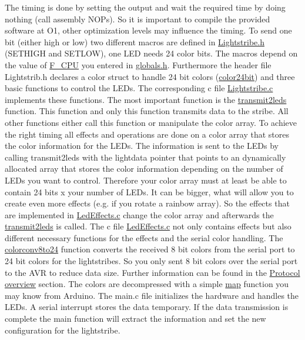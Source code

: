 The timing is done by setting the output and wait the required time by doing nothing (call assembly N\+O\+Ps). So it is important to compile the provided software at O1, other optimization levels may influence the timing. To send one bit (either high or low) two different macros are defined in \hyperlink{_lightstribe_8h}{Lightstribe.\+h} (S\+E\+T\+H\+I\+G\+H and S\+E\+T\+L\+O\+W), one L\+E\+D needs 24 color bits. The macros depend on the value of \hyperlink{globals_8h_a43bafb28b29491ec7f871319b5a3b2f8}{F\+\_\+\+C\+P\+U} you entered in \hyperlink{globals_8h}{globals.\+h}. Furthermore the header file Lightstrib.\+h declares a color struct to handle 24 bit colors (\hyperlink{structcolor24bit}{color24bit}) and three basic functions to control the L\+E\+Ds. The corresponding c file \hyperlink{_lightstribe_8c}{Lightstribe.\+c} implements these functions. The most important function is the \hyperlink{_lightstribe_8h_aac724dad670e4a26723daf71ce6a8d8a}{transmit2leds} function. This function and only this function transmits data to the stribe. All other functions either call this function or manipulate the color array. To achieve the right timing all effects and operations are done on a color array that stores the color information for the L\+E\+Ds. The information is sent to the L\+E\+Ds by calling transmit2leds with the lightdata pointer that points to an dynamically allocated array that stores the color information depending on the number of L\+E\+Ds you want to control. Therefore your color array must at least be able to contain 24 bits x your number of L\+E\+Ds. It can be bigger, what will allow you to create even more effects (e.\+g. if you rotate a rainbow array). So the effects that are implemented in \hyperlink{_led_effects_8c}{Led\+Effects.\+c} change the color array and afterwards the \hyperlink{_lightstribe_8h_aac724dad670e4a26723daf71ce6a8d8a}{transmit2leds} is called. The c file \hyperlink{_led_effects_8c}{Led\+Effects.\+c} not only contains effects but also different necessary functions for the effects and the serial color handling. The \hyperlink{_led_effects_8h_a55291315ab0f2ca8d508f0e9da1920a7}{colorconv8to24} function converts the received 8 bit colors from the serial port to 24 bit colors for the lightstribes. So you only sent 8 bit colors over the serial port to the A\+V\+R to reduce data size. Further information can be found in the \hyperlink{index_protocol_sec}{Protocol overview} section. The colors are decompressed with a simple \hyperlink{_led_effects_8h_ad67a4e660b5122ed454e101432bbdba0}{map} function you may know from Arduino. The main.\+c file initializes the hardware and handles the L\+E\+Ds. A serial interrupt stores the data temporary. If the data transmission is complete the main function will extract the information and set the new configuration for the lightstribe.~\newline
